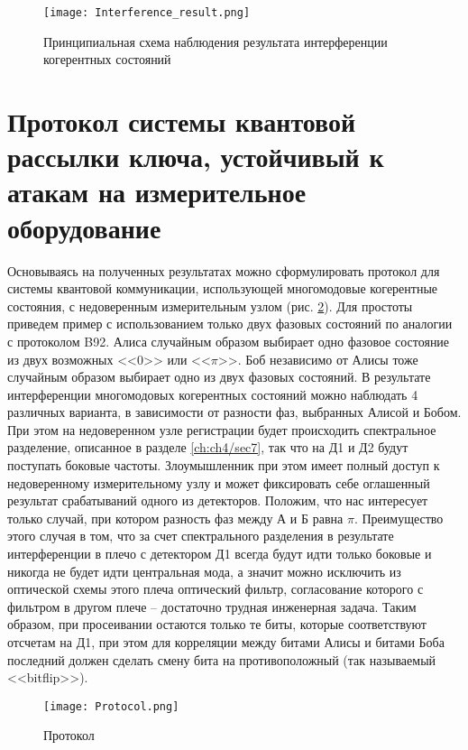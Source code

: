 \begin{figure}[ht]
 \centering
  \texttt{[image: Interference\_result.png]}
  \caption{Принципиальная схема наблюдения результата интерференции когерентных состояний}
  \label{fig:Interference_result}
\end{figure}

\pagebreak

\section{Протокол системы квантовой рассылки ключа, устойчивый к атакам на измерительное оборудование} \label{ch:ch4/sec8}

Основываясь на полученных результатах можно сформулировать протокол для системы квантовой коммуникации, использующей многомодовые когерентные состояния, с недоверенным измерительным узлом (рис. \ref{fig:Protocol}). Для простоты приведем пример с использованием только двух фазовых состояний по аналогии с протоколом B92. Алиса случайным образом выбирает одно фазовое состояние из двух возможных <<$0$>> или <<$\pi$>>. Боб независимо от Алисы тоже случайным образом выбирает одно из двух фазовых состояний. В результате интерференции многомодовых когерентных состояний можно наблюдать 4 различных варианта, в зависимости от разности фаз, выбранных Алисой и Бобом.  При этом на недоверенном узле регистрации будет происходить спектральное разделение, описанное в разделе \ref{ch:ch4/sec7}, так что на Д1 и Д2 будут поступать боковые частоты. Злоумышленник при этом имеет полный доступ к недоверенному измерительному узлу и может фиксировать себе оглашенный результат срабатываний одного из детекторов. Положим, что нас интересует только случай, при котором разность фаз между А и Б равна $\pi$. Преимущество этого случая в том, что за счет спектрального разделения в результате интерференции в плечо с детектором Д1 всегда будут идти только боковые и никогда не будет идти центральная мода, а значит можно исключить из оптической схемы этого плеча оптический фильтр, согласование которого с фильтром в другом плече -- достаточно трудная инженерная задача. Таким образом, при просеивании остаются только те биты, которые соответствуют отсчетам на Д1, при этом для корреляции между битами Алисы и битами Боба последний должен сделать смену бита на противоположный (так называемый <<bitflip>>).  

\begin{figure}[ht]
 \centering
  \texttt{[image: Protocol.png]}
  \caption{Протокол}
  \label{fig:Protocol}
\end{figure}


